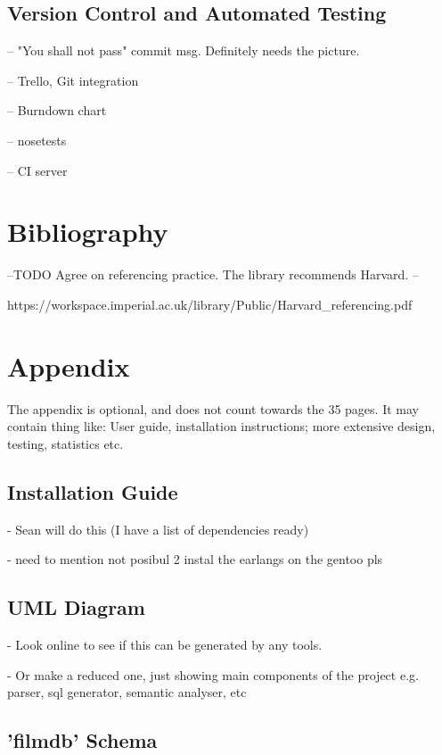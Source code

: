 \documentclass[a4paper, 11pt]{article}
\begin{document}
  \subsection{Version Control and Automated Testing}
  -- "You shall not pass" commit msg. Definitely needs the picture.

    -- Trello, Git integration

    -- Burndown chart

    -- nosetests

    -- CI server

\section{Bibliography}
  \printbibliography

  --TODO Agree on referencing practice. The library recommends Harvard. --

  https://workspace.imperial.ac.uk/library/Public/Harvard\_referencing.pdf

\appendix
\section{Appendix}
  The appendix is optional, and does not count towards the 35 pages. It may
  contain thing like: User guide, installation instructions; more extensive
  design, testing, statistics etc.

  \subsection{Installation Guide}

  - Sean will do this (I have a list of dependencies ready)

  - need to mention not posibul 2 instal the earlangs on the gentoo pls

  \subsection{UML Diagram}

  - Look online to see if this can be generated by any tools.

  - Or make a reduced one, just showing main components of the project e.g.
  parser, sql generator, semantic analyser, etc

  \subsection{'filmdb' Schema}
\end{document}
